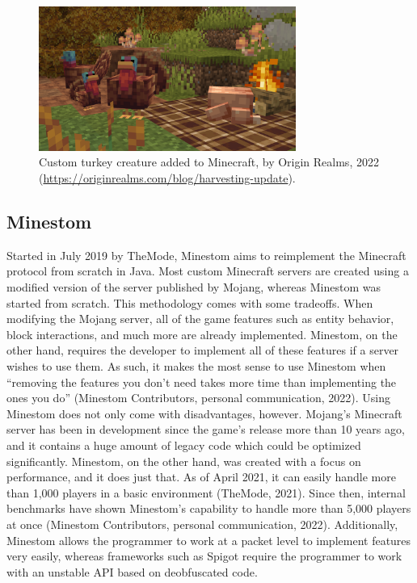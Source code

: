 \documentclass{article}
\begin{document}
\begin{onehalfspacing}
\begin{figure}[h] 
    \centering
    \includegraphics[width=0.75\textwidth]{media/media/image4.png} 
    \caption{Custom turkey creature added to Minecraft, by Origin
    Realms, 2022 \\ (\url{https://originrealms.com/blog/harvesting-update}). }
    \label{fig:2_4_1_2} 
\end{figure}

\subsection{Minestom}

Started in July 2019 by TheMode, Minestom aims to reimplement the
Minecraft protocol from scratch in Java. Most custom Minecraft servers
are created using a modified version of the server published by Mojang,
whereas Minestom was started from scratch. This methodology comes with
some tradeoffs. When modifying the Mojang server, all of the game
features such as entity behavior, block interactions, and much more are
already implemented. Minestom, on the other hand, requires the developer
to implement all of these features if a server wishes to use them. As
such, it makes the most sense to use Minestom when ``removing the
features you don't need takes more time than implementing the ones you
do'' (Minestom Contributors, personal communication, 2022). Using
Minestom does not only come with disadvantages, however. Mojang's
Minecraft server has been in development since the game's release more
than 10 years ago, and it contains a huge amount of legacy code which
could be optimized significantly. Minestom, on the other hand, was
created with a focus on performance, and it does just that. As of April
2021, it can easily handle more than 1,000 players in a basic
environment (TheMode, 2021). Since then, internal benchmarks have shown
Minestom's capability to handle more than 5,000 players at once
(Minestom Contributors, personal communication, 2022). Additionally,
Minestom allows the programmer to work at a packet level to implement
features very easily, whereas frameworks such as Spigot require the
programmer to work with an unstable API based on deobfuscated code.


\end{onehalfspacing}
\end{document}

